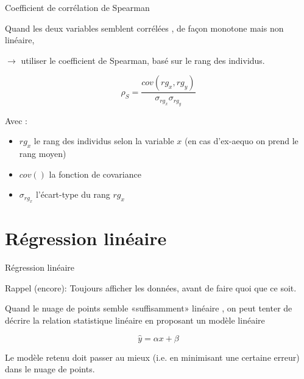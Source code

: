 \documentclass{beamer}
\begin{document}
\begin{frame}{Coefficient de corrélation de Spearman}



Quand les deux variables semblent corrélées , de façon \alert{monotone} mais \alert{non linéaire},

$\rightarrow$ utiliser le coefficient de \alert{Spearman}, basé sur le \alert{rang} des individus.


$$\rho_S= \frac{cov(rg_x, rg_y)}{\sigma_{rg_x}\sigma_{rg_y}}$$


Avec :
\begin{itemize}
  \item $rg_x$ le rang des individus selon la variable $x$  (en cas d'ex-aequo on prend le rang moyen)
  \item $cov()$ la fonction de covariance
  \item $\sigma_{rg_x}$ l'écart-type du rang $rg_x$
\end{itemize}



\end{frame}


\section{Régression linéaire}

\begin{frame}{Régression linéaire}


Rappel (encore): \alert{Toujours} afficher les données, avant de faire quoi que ce soit.


Quand le nuage de points semble «suffisamment» linéaire , on peut tenter de décrire la relation statistique linéaire en proposant un \alert{modèle}  linéaire 

$$\hat{y} = \alpha x + \beta$$



Le modèle retenu doit passer \alert{au mieux} (i.e. en minimisant une certaine erreur) dans le nuage de points.


\end{frame}
\end{document}

